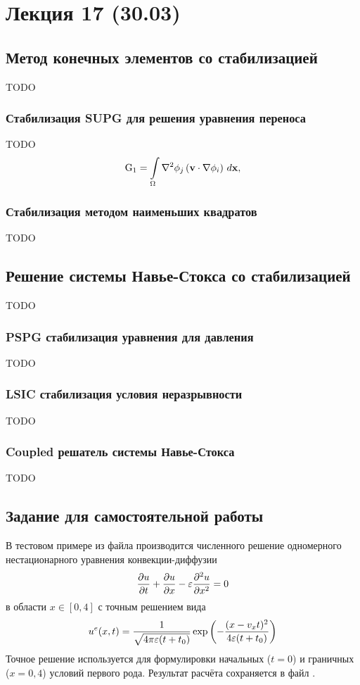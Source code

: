 \section{Лекция 17 (30.03)}

\subsection{Метод конечных элементов со стабилизацией}
TODO
\subsubsection{Стабилизация SUPG для решения уравнения переноса}
TODO
\begin{equation}
\label{eq:fem_supg_g1}
{\rm G}_1 = \int\limits_{\Omega}\nabla^2 \phi_j \left(\boldsymbol{\rm v} \cdot \nabla \phi_i\right) \, d \boldsymbol{\rm x},
\end{equation}

\subsubsection{Стабилизация методом наименьших квадратов}
TODO

\subsection{Решение системы Навье-Стокса со стабилизацией}
TODO

\subsubsection{PSPG стабилизация уравнения для давления}
TODO

\subsubsection{LSIC стабилизация условия неразрывности}
TODO

\subsubsection{Coupled решатель системы Навье-Стокса}
TODO

\subsection{Задание для самостоятельной работы}
\label{sec:hw_supg}
В тестовом примере 
из файла 
производится численного решение одномерного нестационарного уравнения конвекции-диффузии
$$
\frac{\partial u}{\partial t} + \frac{\partial u}{\partial x} - \varepsilon \frac{\partial^2 u}{\partial x^2} = 0
$$
в области $x\in[0, 4]$
с точным решением вида
$$
u^e(x, t) = \frac{1}{\sqrt{4\pi \varepsilon (t + t_0)}} \exp\left(-\frac{(x - v_x t)^2}{4\varepsilon(t+t_0)}\right)
$$
Точное решение используется для формулировки начальных ($t=0$) и граничных ($x=0,4$) условий первого рода.
Результат расчёта сохраняется в файл .

